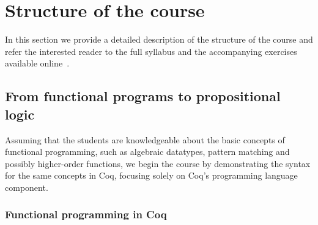 \documentclass[blockstyle,preprint]{sigplanconf}
\newcommand{\etc}{\emph{etc}}
\begin{document}
\section{Structure of the course}


In this section we provide a detailed description of the structure of
the course and refer the interested reader to the full syllabus and
the accompanying exercises available online~\cite{Sergey:PnP}.

\subsection{From functional programs to propositional logic}

Assuming that the students are knowledgeable about the basic concepts
of functional programming, such as algebraic datatypes, pattern
matching and possibly higher-order functions, we begin the course by
demonstrating the syntax for the same concepts in Coq, focusing solely
on Coq's programming language component.

\subsubsection{Functional programming in Coq}
\label{sec:programming-coq}
\end{document}
